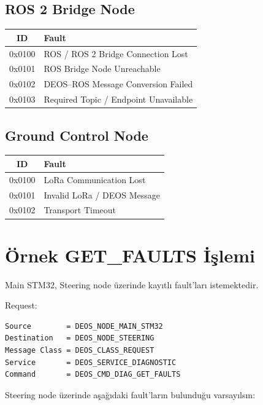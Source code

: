 \documentclass[a4paper,11pt]{article}
\begin{document}
\subsection{ROS 2 Bridge Node}

\begin{center}
\begin{tabular}{c l}
\toprule
\textbf{ID} & \textbf{Fault} \\
\midrule
0x0100 & ROS / ROS 2 Bridge Connection Lost \\
0x0101 & ROS Bridge Node Unreachable \\
0x0102 & DEOS--ROS Message Conversion Failed \\
0x0103 & Required Topic / Endpoint Unavailable \\
\bottomrule
\end{tabular}
\end{center}

\subsection{Ground Control Node}

\begin{center}
\begin{tabular}{c l}
\toprule
\textbf{ID} & \textbf{Fault} \\
\midrule
0x0100 & LoRa Communication Lost \\
0x0101 & Invalid LoRa / DEOS Message \\
0x0102 & Transport Timeout \\
\bottomrule
\end{tabular}
\end{center}

\section{Örnek GET\_FAULTS İşlemi}

Main STM32, Steering node üzerinde kayıtlı fault'ları istemektedir.

Request:

\begin{lstlisting}
Source        = DEOS_NODE_MAIN_STM32
Destination   = DEOS_NODE_STEERING
Message Class = DEOS_CLASS_REQUEST
Service       = DEOS_SERVICE_DIAGNOSTIC
Command       = DEOS_CMD_DIAG_GET_FAULTS
\end{lstlisting}

Steering node üzerinde aşağıdaki fault'ların bulunduğu varsayılsın:
\end{document}
